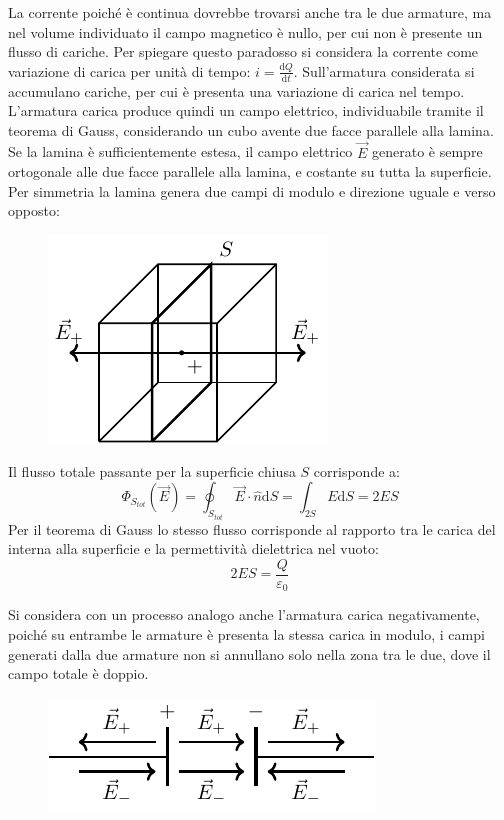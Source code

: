 \documentclass{article}
\newcommand{\df}{\mathrm{d}}
\numberwithin{equation}{subsection}
\begin{document}
La corrente poiché è continua dovrebbe trovarsi anche tra le due armature, ma nel volume individuato il campo magnetico è nullo, per cui non è presente un flusso di cariche. 
Per spiegare questo paradosso si considera la corrente come variazione di carica per unità di tempo: $i=\displaystyle\frac{\df Q}{\df t}$. Sull'armatura considerata si accumulano 
cariche, per cui è presenta una variazione di carica nel tempo. L'armatura carica produce quindi un campo elettrico, individuabile tramite il teorema di Gauss, considerando un 
cubo avente due facce parallele alla lamina. Se la lamina è sufficientemente estesa, il campo elettrico $\vec{E}$ generato è sempre ortogonale alle due facce parallele 
alla lamina, e costante su tutta la superficie. Per simmetria la lamina genera due campi di modulo e direzione uguale e verso opposto:

\begin{figure}[H]%
    \centering
    \includegraphics{flusso-lamina.pdf}
    \label{fig:flusso-lamina}
\end{figure}

Il flusso totale passante per la superficie chiusa $S$ corrisponde a:
\begin{equation*}
    \Phi_{S_{tot}}(\vec{E})=\displaystyle\oint_{S_{tot}}\vec{E}\cdot\hat{n}\df S=\int_{2S}E\df S=2ES
\end{equation*}
Per il teorema di Gauss lo stesso flusso corrisponde al rapporto tra le carica del interna alla superficie e la permettività dielettrica nel vuoto:
\begin{equation*}
    2ES=\displaystyle\frac{Q}{\varepsilon_0}
\end{equation*}

Si considera con un processo analogo anche l'armatura carica negativamente, poiché su entrambe le armature è presenta la stessa carica in modulo, i campi generati dalla due 
armature non si annullano solo nella zona tra le due, dove il campo totale è doppio. 
\begin{figure}[H]%
    \centering
    \includegraphics{campo-elettrico-filo-reciso.pdf}
    \label{fig:campo-elettrico-filo-reciso}
\end{figure}
\end{document}
